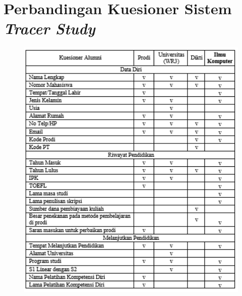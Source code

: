 \chapter{Perbandingan Kuesioner Sistem \textit{Tracer Study}}

\begin{figure}[H]
	\centering
	\includegraphics[width=1.0\textwidth]{gambar/tabelKuesioner}
	\label{tabelKuesioner}
\end{figure}

